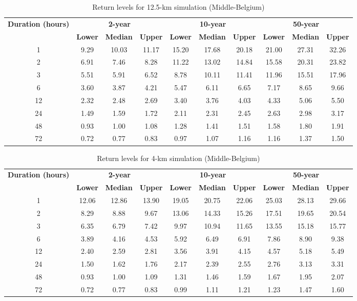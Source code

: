 \begin{table}[p]
\centering
\caption{Return levels for 12.5-km simulation (Middle-Belgium)}
\label{tab:observations}
\begin{tabular}{c||ccc||ccc||ccc}
\hline
\textbf{Duration (hours)} & \multicolumn{3}{c||}{\textbf{2-year}} & \multicolumn{3}{c||}{\textbf{10-year}} & \multicolumn{3}{c}{\textbf{50-year}} \\
\cline{2-10}
& \textbf{Lower} & \textbf{Median} & \textbf{Upper} & \textbf{Lower} & \textbf{Median} & \textbf{Upper} & \textbf{Lower} & \textbf{Median} & \textbf{Upper} \\
\hline
1 & 9.29 & 10.03 & 11.17 & 15.20 & 17.68 & 20.18 & 21.00 & 27.31 & 32.26 \\
2 & 6.91 & 7.46 & 8.28 & 11.22 & 13.02 & 14.84 & 15.58 & 20.31 & 23.82 \\
3 & 5.51 & 5.91 & 6.52 & 8.78 & 10.11 & 11.41 & 11.96 & 15.51 & 17.96 \\
6 & 3.60 & 3.87 & 4.21 & 5.47 & 6.11 & 6.65 & 7.17 & 8.65 & 9.66 \\
12 & 2.32 & 2.48 & 2.69 & 3.40 & 3.76 & 4.03 & 4.33 & 5.06 & 5.50 \\
24 & 1.49 & 1.59 & 1.72 & 2.11 & 2.31 & 2.45 & 2.63 & 2.98 & 3.17 \\
48 & 0.93 & 1.00 & 1.08 & 1.28 & 1.41 & 1.51 & 1.58 & 1.80 & 1.91 \\
72 & 0.72 & 0.77 & 0.83 & 0.97 & 1.07 & 1.16 & 1.16 & 1.37 & 1.50 \\
\hline
\end{tabular}
\end{table}

\begin{table}[p]
\centering
\caption{Return levels for 4-km simulation (Middle-Belgium)}
\label{tab:observations}
\begin{tabular}{c||ccc||ccc||ccc}
\hline
\textbf{Duration (hours)} & \multicolumn{3}{c||}{\textbf{2-year}} & \multicolumn{3}{c||}{\textbf{10-year}} & \multicolumn{3}{c}{\textbf{50-year}} \\
\cline{2-10}
& \textbf{Lower} & \textbf{Median} & \textbf{Upper} & \textbf{Lower} & \textbf{Median} & \textbf{Upper} & \textbf{Lower} & \textbf{Median} & \textbf{Upper} \\
\hline
1 & 12.06 & 12.86 & 13.90 & 19.05 & 20.75 & 22.06 & 25.03 & 28.13 & 29.66 \\
2 & 8.29 & 8.88 & 9.67 & 13.06 & 14.33 & 15.26 & 17.51 & 19.65 & 20.54 \\
3 & 6.35 & 6.79 & 7.42 & 9.97 & 10.94 & 11.65 & 13.55 & 15.18 & 15.77 \\
6 & 3.89 & 4.16 & 4.53 & 5.92 & 6.49 & 6.91 & 7.86 & 8.90 & 9.38 \\
12 & 2.40 & 2.59 & 2.81 & 3.56 & 3.91 & 4.15 & 4.57 & 5.18 & 5.49 \\
24 & 1.50 & 1.62 & 1.76 & 2.17 & 2.39 & 2.55 & 2.76 & 3.13 & 3.31 \\
48 & 0.93 & 1.00 & 1.09 & 1.31 & 1.46 & 1.59 & 1.67 & 1.95 & 2.07 \\
72 & 0.72 & 0.77 & 0.83 & 0.99 & 1.11 & 1.21 & 1.23 & 1.47 & 1.60 \\
\hline
\end{tabular}
\end{table}

